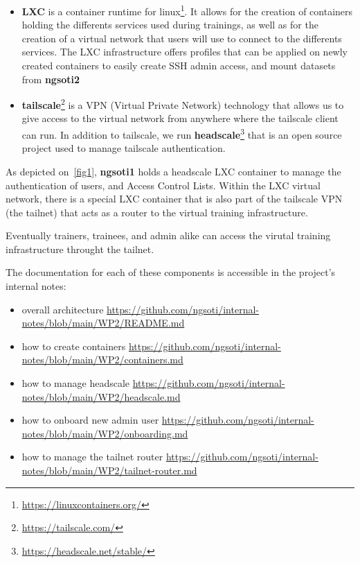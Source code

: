 \begin{itemize}

	\item {\bf{LXC}} is a container runtime for
	linux{\footnote{\url{https://linuxcontainers.org/}}}. It allows for the
	creation of containers holding the differents services used during
	trainings, as well as for the creation of a virtual network that users will
	use to connect to the differents services. The LXC infrastructure offers
	profiles that can be applied on newly created containers to easily create
	SSH admin access, and mount datasets from {\bf{ngsoti2}}
	
	\item {\bf{tailscale}}{\footnote{\url{https://tailscale.com/}}} is a VPN
	(Virtual Private Network) technology that allows us to give access to the
	virtual network from anywhere where the tailscale client can run. In
	addition to tailscale, we run
	{\bf{headscale}}{\footnote{\url{https://headscale.net/stable/}}} that is an open
	source project used to manage tailscale authentication.
	
\end{itemize}

As depicted on~\ref{fig1}, {\bf{ngsoti1}} holds a headscale LXC container to
manage the authentication of users, and Access Control Lists. Within the LXC
virtual network, there is a special LXC container that is also part of the
tailscale VPN (the tailnet) that acts as a router to the virtual training
infrastructure. 

Eventually trainers, trainees, and admin alike can access the virutal training infrastructure throught the tailnet.

The documentation for each of these components is accessible in the project's internal notes:

\begin{itemize}
	\item overall architecture \url{https://github.com/ngsoti/internal-notes/blob/main/WP2/README.md}
	\item how to create containers \url{https://github.com/ngsoti/internal-notes/blob/main/WP2/containers.md}
	\item how to manage headscale \url{https://github.com/ngsoti/internal-notes/blob/main/WP2/headscale.md}
	\item how to onboard new admin user \url{https://github.com/ngsoti/internal-notes/blob/main/WP2/onboarding.md}
	\item how to manage the tailnet router \url{https://github.com/ngsoti/internal-notes/blob/main/WP2/tailnet-router.md}
\end{itemize}

